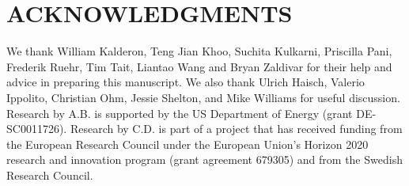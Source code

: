 \documentclass{ar-1col}
\begin{document}
\section*{ACKNOWLEDGMENTS}

We thank William Kalderon, Teng Jian Khoo, Suchita Kulkarni,
Priscilla Pani, Frederik Ruehr, Tim Tait, Liantao Wang and Bryan Zaldivar
for their help and advice in
preparing this manuscript. We also thank Ulrich Haisch, Valerio
Ippolito, Christian Ohm, Jessie Shelton, and Mike Williams for
useful discussion. Research by A.B. is supported by the US Department of
Energy (grant DE-SC0011726). Research by C.D. is part of a project that
has received funding from the European Research Council
under the European Union's Horizon 2020 research and innovation
program (grant agreement 679305) and from the Swedish
Research Council.
\end{document}

